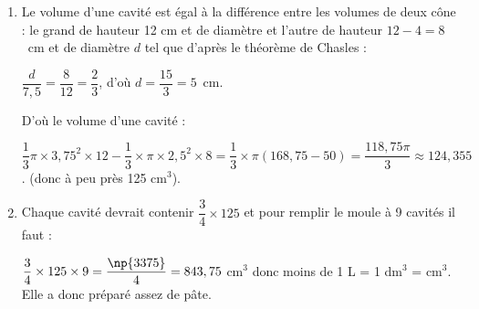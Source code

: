 \begin{enumerate}
\item %
Le volume d'une cavité est égal à la différence entre les volumes de deux cône : le grand de hauteur 12 cm et de diamètre et l'autre de hauteur $12 - 4 = 8$~cm et de diamètre $d$ tel que d'après le théorème de Chasles :

$\dfrac{d}{7,5} = \dfrac{8}{12} = \dfrac{2}{3}$, d'où $d = \dfrac{15}{3} = 5$~cm.

D'où le volume d'une cavité : 

$\dfrac{1}{3}\pi\times 3,75^2 \times 12 - \dfrac{1}{3}\times \pi\times 2,5^2 \times 8 = \dfrac{1}{3}\times \pi(168,75 - 50) = \dfrac{118,75\pi}{3} \approx 124,355$. (donc à peu près 125 cm$^3$). 
\item %
 
Chaque cavité devrait contenir $\dfrac{3}{4} \times 125$ et pour remplir le moule à 9 cavités il faut :

$\dfrac{3}{4} \times 125 \times 9 = \dfrac{\np{3375}}{4} = 843,75$ cm$^3$ donc moins de 1 L = 1 dm$^3$ =  cm$^3$. Elle a donc préparé assez de pâte.
\end{enumerate}
 
\bigskip

